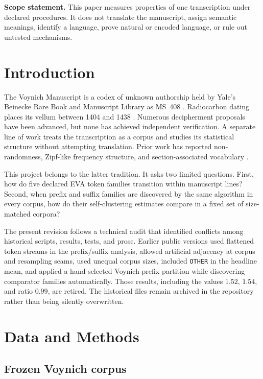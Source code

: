 \documentclass[11pt]{article}
\begin{document}
\bigskip
\noindent\textbf{Scope statement.} This paper measures properties of one
transcription under declared procedures. It does not translate the manuscript,
assign semantic meanings, identify a language, prove natural or encoded
language, or rule out untested mechanisms.

\section{Introduction}

The Voynich Manuscript is a codex of unknown authorship held by Yale's
Beinecke Rare Book and Manuscript Library as MS~408 \citep{Clemens2016}.
Radiocarbon dating places its vellum between 1404 and 1438
\citep{Hodgins2011}. Numerous decipherment proposals have been advanced, but
none has achieved independent verification. A separate line of work treats
the transcription as a corpus and studies its statistical structure without
attempting translation. Prior work has reported non-randomness, Zipf-like
frequency structure, and section-associated vocabulary
\citep{Reddy2011,Montemurro2013,Bowern2021}.

This project belongs to the latter tradition. It asks two limited questions.
First, how do five declared EVA token families transition within manuscript
lines? Second, when prefix and suffix families are discovered by the same
algorithm in every corpus, how do their self-clustering estimates compare in a
fixed set of size-matched corpora?

The present revision follows a technical audit that identified conflicts among
historical scripts, results, tests, and prose. Earlier public versions used
flattened token streams in the prefix/suffix analysis, allowed artificial
adjacency at corpus and resampling seams, used unequal corpus sizes, included
\texttt{OTHER} in the headline mean, and applied a hand-selected Voynich
prefix partition while discovering comparator families automatically. Those
results, including the values $1.52$, $1.54$, and ratio $0.99$, are retired.
The historical files remain archived in the repository rather than being
silently overwritten.

\section{Data and Methods}

\subsection{Frozen Voynich corpus}
\end{document}
